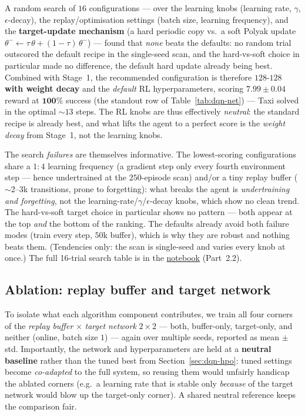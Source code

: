 \documentclass[11pt]{article}
\begin{document}
A random search of $16$ configurations --- over the learning knobs (learning rate, $\gamma$,
$\epsilon$-decay), the replay/optimisation settings (batch size, learning frequency), and the
\textbf{target-update mechanism} (a hard periodic copy vs.\ a soft Polyak update
$\theta^- \leftarrow \tau\,\theta + (1-\tau)\,\theta^-$) --- found that \emph{none} beats the
defaults: no random trial outscored the default recipe in the single-seed scan, and the
hard-vs-soft choice in particular made no difference, the default hard update already being best. Combined with
Stage~1, the recommended configuration is therefore $128$\nobreakdash-$128$ \textbf{with weight
decay} and the \emph{default} RL hyperparameters, scoring $\mathbf{7.99 \pm 0.04}$ reward at
$\mathbf{100\%}$ success (the standout row of Table~\ref{tab:dqn-net}) --- Taxi solved in the
optimal ${\sim}13$ steps. The RL knobs are thus effectively \emph{neutral}: the standard recipe is
already best, and what lifts the agent to a perfect score is the \emph{weight decay} from
Stage~1, not the learning knobs.

\noindent The search \emph{failures} are themselves informative. The lowest-scoring configurations
share a $1{:}4$ learning frequency (a gradient step only every fourth environment step --- hence
undertrained at the $250$-episode scan) and/or a tiny replay buffer ($\sim$2--3k transitions, prone
to forgetting): what breaks the agent is \emph{undertraining and forgetting}, not the
learning-rate/$\gamma$/$\epsilon$-decay knobs, which show no clean trend. The hard-vs-soft target
choice in particular shows no pattern --- both appear at the top \emph{and} the bottom of the
ranking. The defaults already avoid both failure modes (train every step, $50$k buffer), which is
why they are robust and nothing beats them. (Tendencies only: the scan is single-seed and varies
every knob at once.) The full 16-trial search table is in the
\href{https://github.com/asugar13/rl-taxi-pong/blob/main/DQN_Taxi.ipynb}{notebook} (Part~2.2).

\subsection{Ablation: replay buffer and target network}
\label{sec:dqn-ablation}
To isolate what each algorithm component contributes, we train all four corners of the
\emph{replay buffer} $\times$ \emph{target network} $2\times 2$ --- both, buffer-only,
target-only, and neither (online, batch size $1$) --- again over multiple seeds, reported as
mean $\pm$ std. Importantly, the network and hyperparameters are held at a \textbf{neutral
baseline} rather than the tuned best from Section~\ref{sec:dqn-hpo}: tuned settings become
\emph{co-adapted} to the full system, so reusing them would unfairly handicap the ablated corners
(e.g.\ a learning rate that is stable only \emph{because} of the target network would blow up the
target-only corner). A shared neutral reference keeps the comparison fair.
\end{document}

